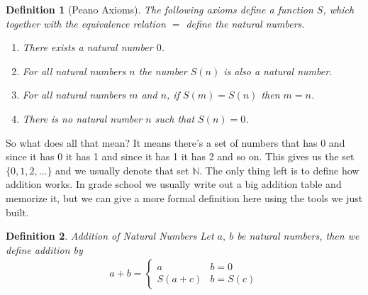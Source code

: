 \documentclass[oneside]{book}
\newtheorem{definition}{Definition}
\newcommand{\set}[1]{\{#1\}}
\begin{document}
\begin{spacing}{1.618}
\begin{definition}[Peano Axioms]
The following axioms define a function $S$, which together with the equivalence relation $=$ define the natural numbers. 
\begin{enumerate}
	\item There exists a natural number $0$. 
	\item For all natural numbers $n$ the number $S(n)$ is also a natural number. 
	\item For all natural numbers $m$ and $n$, if $S(m)=S(n)$ then $m=n$. 
	\item There is no natural number $n$ such that $S(n)=0$. 
\end{enumerate}
\end{definition}

So what does all that mean? It means there's a set of numbers that has 0 and since it has 0 it has 1 and since it has 1 it has 2 and so on. This gives us the set $\set{0, 1, 2, \dots}$ and we usually denote that set $\mathbb{N}$. The only thing left is to define how addition works. In grade school we usually write out a big addition table and memorize it, but we can give a more formal definition here using the tools we just built. 

\begin{definition}{Addition of Natural Numbers}
	Let $a,~b$ be natural numbers, then we define addition by
	\begin{alignat*}{4}
		a+b=\begin{cases}
			a&b=0 \\
			S(a+c)&b=S(c)
		\end{cases}
	\end{alignat*}
\end{definition}


\end{spacing}
\backmatter



\printbibliography
\clearpage

\printindex
\end{document}
